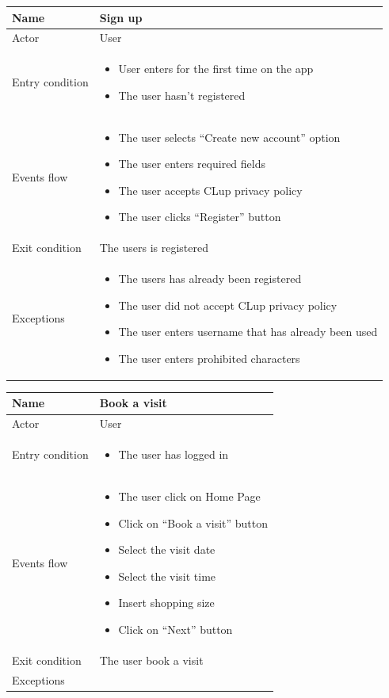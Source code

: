 \par \medskip

\begin{tabular}{|p{5cm} | p{7cm} | }
	\hline
	Name & Sign up \\
	\hline
	Actor & User \\
	\hline
	Entry condition &
	\begin{itemize}
		\item User enters for the first time on the app 
		\item The user hasn’t registered
	\end{itemize} \\
	\hline
	Events flow & 
	\begin{itemize}
		\item The user selects “Create new account” option
		\item The user enters required fields
		\item The user accepts CLup privacy policy
		\item The user clicks “Register” button
	\end{itemize} \\
	\hline
	Exit condition & The users is registered \\
	\hline 
	Exceptions &
	\begin{itemize}
		\item The users has already been registered
		\item The user did not accept CLup privacy policy
		\item The user enters username that has already been used
		\item The user enters prohibited characters
	\end{itemize} \\
	\hline
\end{tabular}

\par \medskip

\begin{tabular}{|p{5cm} | p{7cm} | }
	\hline
	Name & Book a visit \\
	\hline
	Actor & User \\
	\hline
	Entry condition &
	\begin{itemize}
		\item The user has logged in 
	\end{itemize} \\
	\hline
	Events flow & 
	\begin{itemize}
		\item The user click on Home Page
		\item Click on “Book a visit” button
		\item Select the visit date
		\item Select the visit time
		\item Insert shopping size
		\item Click on “Next” button
	\end{itemize} \\
	\hline
	Exit condition & The user book a visit \\
	\hline 
	Exceptions & \\
	\hline
\end{tabular}

